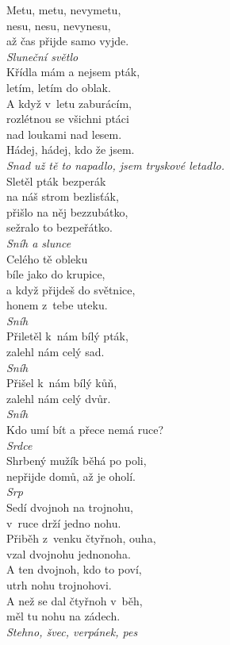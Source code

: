 \begin{multicols}{\value{columnsthindata}}
\noindent
Metu, metu, nevymetu,\\
nesu, nesu, nevynesu,\\
až čas přijde samo vyjde.\\[1 mm]
{\sl Sluneční světlo}\\

\noindent
Křídla mám a nejsem pták,\\
letím, letím do oblak.\\
A když v~letu zaburácím,\\
rozlétnou se všichni ptáci\\
nad loukami nad lesem.\\
Hádej, hádej, kdo že jsem.\\[1 mm]
{\sl Snad už tě to napadlo, jsem tryskové letadlo.}\\

\noindent
Sletěl pták bezperák\\
na náš strom bezlisťák,\\
přišlo na něj bezzubátko,\\
sežralo to bezpeřátko.\\[1 mm]
{\sl Sníh a slunce}\\

\noindent
Celého tě obleku\\
bíle jako do krupice,\\
a když přijdeš do světnice,\\
honem z~tebe uteku.\\[1 mm]
{\sl Sníh}\\

\noindent
Přiletěl k~nám bílý pták,\\
zalehl nám celý sad.\\[1 mm]
{\sl Sníh}\\

\noindent
Přišel k~nám bílý kůň,\\
zalehl nám celý dvůr.\\[1 mm]
{\sl Sníh}\\

\noindent
Kdo umí bít a přece nemá ruce?\\[1 mm]
{\sl Srdce}\\

\noindent
Shrbený mužík běhá po poli,\\
nepřijde domů, až je oholí.\\[1 mm]
{\sl Srp}\\

\noindent
Sedí dvojnoh na trojnohu,\\
v~ruce drží jedno nohu.\\
Přiběh z~venku čtyřnoh, ouha,\\
vzal dvojnohu jednonoha.\\
A ten dvojnoh, kdo to poví,\\
utrh nohu trojnohovi.\\
A než se dal čtyřnoh v~běh,\\
měl tu nohu na zádech.\\[1 mm]
{\sl Stehno, švec, verpánek, pes}\\


\end{multicols}
